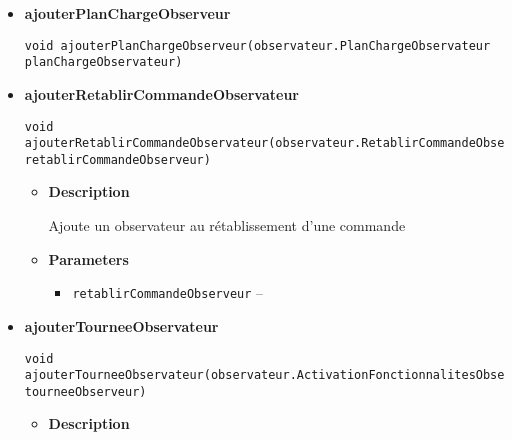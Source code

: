 \documentclass[11pt,a4paper]{report}
\begin{document}
{{{{\begin{itemize}
{\begin{itemize}
{Ajoute un observateur au changement du modèle
}
\item{
{\bf  Parameters}
  \begin{itemize}
   \item{
\texttt{observeur} -- }
  \end{itemize}
}%
\end{itemize}
}%
\item{ 
\hypertarget{controleur.ControleurInterface.ajouterPlanChargeObserveur(controleur.observateur.PlanChargeObservateur)}{{\bf  ajouterPlanChargeObserveur}\\}
\begin{lstlisting}[frame=none]
void ajouterPlanChargeObserveur(observateur.PlanChargeObservateur planChargeObservateur)\end{lstlisting} %
}%
\item{ 
\hypertarget{controleur.ControleurInterface.ajouterRetablirCommandeObservateur(controleur.observateur.RetablirCommandeObservateur)}{{\bf  ajouterRetablirCommandeObservateur}\\}
\begin{lstlisting}[frame=none]
void ajouterRetablirCommandeObservateur(observateur.RetablirCommandeObservateur retablirCommandeObserveur)\end{lstlisting} %
\begin{itemize}
\item{
{\bf  Description}

Ajoute un observateur au rétablissement d'une commande
}
\item{
{\bf  Parameters}
  \begin{itemize}
   \item{
\texttt{retablirCommandeObserveur} -- }
  \end{itemize}
}%
\end{itemize}
}%
\item{ 
\hypertarget{controleur.ControleurInterface.ajouterTourneeObservateur(controleur.observateur.ActivationFonctionnalitesObservateur)}{{\bf  ajouterTourneeObservateur}\\}
\begin{lstlisting}[frame=none]
void ajouterTourneeObservateur(observateur.ActivationFonctionnalitesObservateur tourneeObserveur)\end{lstlisting} %
\begin{itemize}
\item{
{\bf  Description}

}
\end{itemize}}
\end{itemize}}}}}
\end{document}
